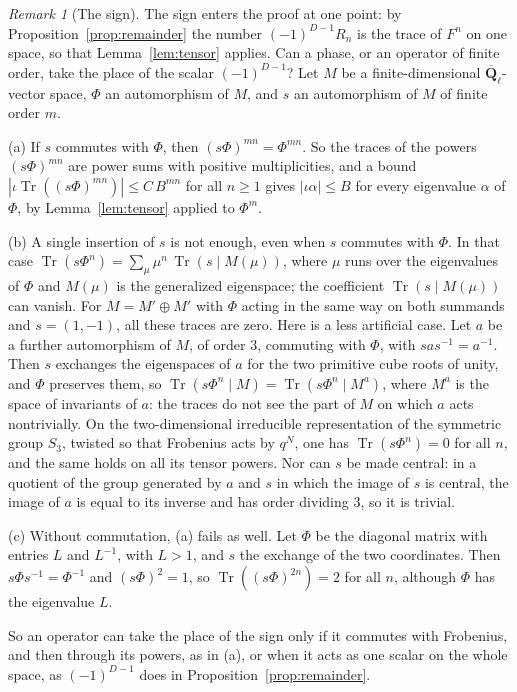 \documentclass[11pt,a4paper]{article}
\theoremstyle{plain}
\theoremstyle{remark}
\newtheorem{remark}[theorem]{Remark}
\newcommand{\Ql}{\overline{\mathbf Q}_\ell}
\newcommand{\Tr}{\operatorname{Tr}}
\begin{document}
\begin{remark}[The sign]\label{rem:sign}
The sign enters the proof at one point: by Proposition~\ref{prop:remainder} the number $(-1)^{D-1}R_n$ is the trace
of $F^n$ on one space, so that Lemma~\ref{lem:tensor} applies. Can a phase, or an operator of finite order, take the
place of the scalar $(-1)^{D-1}$? Let $M$ be a finite-dimensional $\Ql$-vector space, $\Phi$ an automorphism of $M$,
and $s$ an automorphism of $M$ of finite order $m$.

(a) If $s$ commutes with $\Phi$, then $(s\Phi)^{mn}=\Phi^{mn}$. So the traces of the powers $(s\Phi)^{mn}$ are power
sums with positive multiplicities, and a bound $|\iota\Tr((s\Phi)^{mn})|\le C\,B^{mn}$ for all $n\ge1$ gives
$|\iota\alpha|\le B$ for every eigenvalue $\alpha$ of $\Phi$, by Lemma~\ref{lem:tensor} applied to $\Phi^m$.

(b) A single insertion of $s$ is not enough, even when $s$ commutes with $\Phi$. In that case
$\Tr(s\Phi^n)=\sum_\mu\mu^n\,\Tr(s\mid M(\mu))$, where $\mu$ runs over the eigenvalues of $\Phi$ and $M(\mu)$ is
the generalized eigenspace; the coefficient $\Tr(s\mid M(\mu))$ can vanish. For $M=M'\oplus M'$ with $\Phi$ acting
in the same way on both summands and $s=(1,-1)$, all these traces are zero. Here is a less artificial case. Let
$a$ be a further automorphism of $M$, of order $3$, commuting with $\Phi$, with $sas^{-1}=a^{-1}$. Then $s$
exchanges the eigenspaces of $a$ for the two primitive cube roots of unity, and $\Phi$ preserves them, so
$\Tr(s\Phi^n\mid M)=\Tr(s\Phi^n\mid M^{a})$, where $M^a$ is the space of invariants of $a$: the traces do not see
the part of $M$ on which $a$ acts nontrivially. On the two-dimensional irreducible representation of the symmetric
group $S_3$, twisted so that Frobenius acts by $q^N$, one has $\Tr(s\Phi^n)=0$ for all $n$, and the same holds on
all its tensor powers. Nor can $s$ be made central: in a quotient of the group generated by $a$ and $s$ in which
the image of $s$ is central, the image of $a$ is equal to its inverse and has order dividing $3$, so it is trivial.

(c) Without commutation, (a) fails as well. Let $\Phi$ be the diagonal matrix with entries $L$ and $L^{-1}$, with
$L>1$, and $s$ the exchange of the two coordinates. Then $s\Phi s^{-1}=\Phi^{-1}$ and $(s\Phi)^2=1$, so
$\Tr((s\Phi)^{2n})=2$ for all $n$, although $\Phi$ has the eigenvalue $L$.

So an operator can take the place of the sign only if it commutes with Frobenius, and then through its powers, as
in (a), or when it acts as one scalar on the whole space, as $(-1)^{D-1}$ does in Proposition~\ref{prop:remainder}.
\end{remark}
\end{document}
